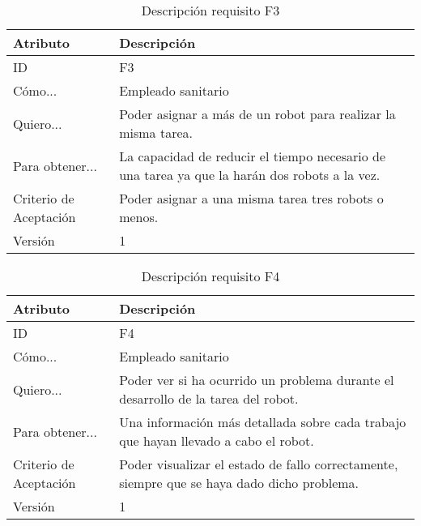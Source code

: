 \begin{table}[H]
    \label{tab:reqF3}
 	\caption{Descripción requisito F3}
	\centering
	
	\begin{tabular}{C{3cm}|C{12cm}}
 		\toprule
 		\textbf{Atributo} & \textbf{Descripción} \\
 		\midrule
 	    ID & F3 \\
 	    Cómo... & Empleado sanitario \\
 	    Quiero... & Poder asignar a más de un robot para realizar la misma tarea. \\
 	    Para obtener... & La capacidad de reducir el tiempo necesario de una tarea ya que la harán dos robots a la vez.  \\
 	    Criterio de Aceptación & Poder asignar a una misma tarea tres robots o menos. \\
 	    Versión & 1 \\
 		\bottomrule
 		\end{tabular}
\end{table}

\begin{table}[H]
    \label{tab:reqF4}
 	\caption{Descripción requisito F4}
	\centering
	
	\begin{tabular}{C{3cm}|C{12cm}}
 		\toprule
 		\textbf{Atributo} & \textbf{Descripción} \\
 		\midrule
 	    ID & F4 \\
 	    Cómo... & Empleado sanitario \\
 	    Quiero... & Poder ver si ha ocurrido un problema durante el desarrollo de la tarea del robot.\\
 	    Para obtener... & Una información más detallada sobre cada trabajo que hayan llevado a cabo el robot.  \\
 	    Criterio de Aceptación & Poder visualizar el estado de fallo correctamente, siempre que se haya dado dicho problema. \\
 	    Versión & 1 \\
 		\bottomrule
 		\end{tabular}
\end{table}



